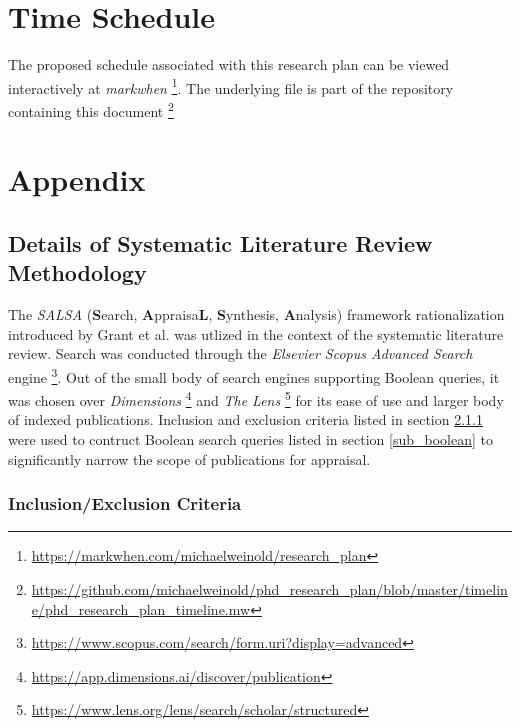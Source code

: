 \documentclass{article}
\begin{document}
 

\section{Time Schedule}

The proposed schedule associated with this research plan can be viewed interactively at \textit{markwhen} \footnote{\url{https://markwhen.com/michaelweinold/research_plan}}. The underlying file is part of the repository containing this document \footnote{\url{https://github.com/michaelweinold/phd_research_plan/blob/master/timeline/phd_research_plan_timeline.mw}}

\newpage
\section{Appendix}


    \subsection{Details of Systematic Literature Review Methodology}
    
        The \textit{SALSA} (\textbf{S}earch, \textbf{A}ppraisa\textbf{L}, \textbf{S}ynthesis, \textbf{A}nalysis) framework rationalization introduced by Grant et al. \cite{grant_typology_2009} was utlized in the context of the systematic literature review. Search was conducted through the \textit{Elsevier Scopus Advanced Search} engine \footnote{\url{https://www.scopus.com/search/form.uri?display=advanced}}. Out of the small body of search engines supporting Boolean queries, it was chosen over \textit{Dimensions} \footnote{\url{https://app.dimensions.ai/discover/publication}} and \textit{The Lens} \footnote{\url{https://www.lens.org/lens/search/scholar/structured}} for its ease of use and larger body of indexed publications. Inclusion and exclusion criteria listed in section \ref{subsub_inclusion_exclusion} were used to contruct Boolean search queries listed in section \ref{sub_boolean} to significantly narrow the scope of publications for appraisal. 
        
        \subsubsection{Inclusion/Exclusion Criteria}
        \label{subsub_inclusion_exclusion}
        
\end{document}
